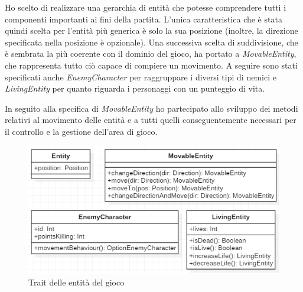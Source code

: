 Ho scelto di realizzare una gerarchia di entità che potesse comprendere tutti i componenti importanti ai fini della partita. L'unica caratteristica che è stata quindi scelta per l'entità più generica è solo la sua posizione (inoltre, la direzione specificata nella posizione è opzionale). Una successiva scelta di suddivisione, che è sembrata la più coerente con il dominio del gioco, ha portato a \textit{MovableEntity}, che rappresenta tutto ciò capace di compiere un movimento. A seguire sono stati specificati anche \textit{EnemyCharacter} per raggruppare i diversi tipi di nemici e \textit{LivingEntity} per quanto riguarda i personaggi con un punteggio di vita.

In seguito alla specifica di \textit{MovableEntity} ho partecipato allo sviluppo dei metodi relativi al movimento delle entità e a tutti quelli conseguentemente necessari per il controllo e la gestione dell'area di gioco.

\begin{figure}[H]
  \includegraphics[width=14cm]{res/entitiesTraits.png}
  \caption{Trait delle entità del gioco}
  \label{entityTraits}
\end{figure}